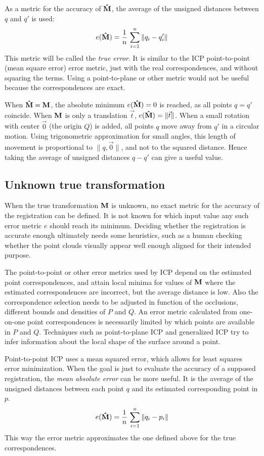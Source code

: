 As a metric for the accuracy of $\mathbf{\hat{M}}$, the average of the unsigned distances between $q$ and $q'$ is used:
\begin{equation}
e(\mathbf{\hat{M}}) = \frac{1}{n} \, \sum_{i=1}^{n} \| q_i - q'_i \|
\end{equation}
This metric will be called the \emph{true error}. It is similar to the ICP point-to-point (mean square error) error metric, just with the real correspondences, and without squaring the terms. Using a point-to-plane or other metric would not be useful because the correspondences are exact.

When $\mathbf{\hat{M}} = \mathbf{M}$, the absolute minimum $e(\mathbf{\hat{M}}) = 0$ is reached, as all points $q = q'$ coincide. When $\mathbf{M}$ is only a translation $\vec{t}$, $e(\mathbf{\hat{M}}) = \| \vec{t} \|$. When a small rotation with center $\vec{0}$ (the origin $Q$) is added, all points $q$ move away from $q'$ in a circular motion. Using trigonometric approximation for small angles, this length of movement is proportional to $\| q, \vec{0}\|$, and not to the squared distance. Hence taking the average of unsigned distances $q - q'$ can give a useful value.

\subsection{Unknown true transformation}
When the true transformation $\mathbf{M}$ is unknown, no exact metric for the accuracy of the registration can be defined. It is not known for which input value any such error metric $e$ should reach its minimum. Deciding whether the registration is accurate enough ultimately needs some heuristics, such as a human checking whether the point clouds visually appear well enough aligned for their intended purpose.

The point-to-point or other error metrics used by ICP depend on the estimated point correspondences, and attain local minima for values of $\mathbf{M}$ where the estimated correspondences are incorrect, but the average distance is low. Also the correspondence selection needs to be adjusted in function of the occlusions, different bounds and densities of $P$ and $Q$. An error metric calculated from one-on-one point correspondences is necessarily limited by which points are available in $P$ and $Q$. Techniques such as point-to-plane ICP and generalized ICP try to infer information about the local shape of the surface around a point.

Point-to-point ICP uses a mean squared error, which allows for least squares error minimization. When the goal is just to evaluate the accuracy of a supposed registration, the \emph{mean absolute error} can be more useful. It is the average of the unsigned distances between each point $q$ and its estimated corresponding point in $p$.
\begin{equation}
e(\mathbf{\hat{M}}) = \frac{1}{n} \, \sum_{i=1}^{n} \| q_i - p_i \|
\end{equation}
This way the error metric approximates the one defined above for the true correspondences.


